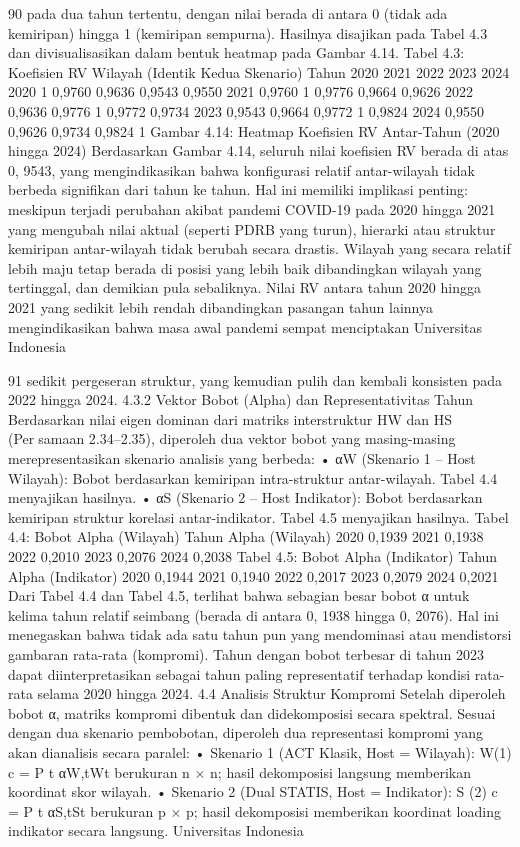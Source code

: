 90
pada dua tahun tertentu, dengan nilai berada di antara 0 (tidak ada kemiripan) hingga
1 (kemiripan sempurna). Hasilnya disajikan pada Tabel 4.3 dan divisualisasikan dalam
bentuk heatmap pada Gambar 4.14.
Tabel 4.3: Koefisien RV Wilayah (Identik Kedua Skenario)
Tahun 2020 2021 2022 2023 2024
2020 1 0,9760 0,9636 0,9543 0,9550
2021 0,9760 1 0,9776 0,9664 0,9626
2022 0,9636 0,9776 1 0,9772 0,9734
2023 0,9543 0,9664 0,9772 1 0,9824
2024 0,9550 0,9626 0,9734 0,9824 1
Gambar 4.14: Heatmap Koefisien RV Antar-Tahun (2020 hingga 2024)
Berdasarkan Gambar 4.14, seluruh nilai koefisien RV berada di atas 0, 9543, yang
mengindikasikan bahwa konfigurasi relatif antar-wilayah tidak berbeda signifikan dari
tahun ke tahun. Hal ini memiliki implikasi penting: meskipun terjadi perubahan akibat
pandemi COVID-19 pada 2020 hingga 2021 yang mengubah nilai aktual (seperti PDRB
yang turun), hierarki atau struktur kemiripan antar-wilayah tidak berubah secara drastis.
Wilayah yang secara relatif lebih maju tetap berada di posisi yang lebih baik dibandingkan
wilayah yang tertinggal, dan demikian pula sebaliknya.
Nilai RV antara tahun 2020 hingga 2021 yang sedikit lebih rendah dibandingkan
pasangan tahun lainnya mengindikasikan bahwa masa awal pandemi sempat menciptakan
Universitas Indonesia

91
sedikit pergeseran struktur, yang kemudian pulih dan kembali konsisten pada 2022 hingga
2024.
4.3.2 Vektor Bobot (Alpha) dan Representativitas Tahun
Berdasarkan nilai eigen dominan dari matriks interstruktur HW dan HS (Persamaan 2.34–2.35), diperoleh dua vektor bobot yang masing-masing merepresentasikan
skenario analisis yang berbeda:
• αW (Skenario 1 – Host Wilayah): Bobot berdasarkan kemiripan intra-struktur
antar-wilayah. Tabel 4.4 menyajikan hasilnya.
• αS (Skenario 2 – Host Indikator): Bobot berdasarkan kemiripan struktur korelasi
antar-indikator. Tabel 4.5 menyajikan hasilnya.
Tabel 4.4: Bobot Alpha (Wilayah)
Tahun Alpha (Wilayah)
2020 0,1939
2021 0,1938
2022 0,2010
2023 0,2076
2024 0,2038
Tabel 4.5: Bobot Alpha (Indikator)
Tahun Alpha (Indikator)
2020 0,1944
2021 0,1940
2022 0,2017
2023 0,2079
2024 0,2021
Dari Tabel 4.4 dan Tabel 4.5, terlihat bahwa sebagian besar bobot α untuk kelima
tahun relatif seimbang (berada di antara 0, 1938 hingga 0, 2076). Hal ini menegaskan
bahwa tidak ada satu tahun pun yang mendominasi atau mendistorsi gambaran rata-rata
(kompromi). Tahun dengan bobot terbesar di tahun 2023 dapat diinterpretasikan sebagai
tahun paling representatif terhadap kondisi rata-rata selama 2020 hingga 2024.
4.4 Analisis Struktur Kompromi
Setelah diperoleh bobot α, matriks kompromi dibentuk dan didekomposisi secara
spektral. Sesuai dengan dua skenario pembobotan, diperoleh dua representasi kompromi
yang akan dianalisis secara paralel:
• Skenario 1 (ACT Klasik, Host = Wilayah): W(1)
c =
P
t αW,tWt berukuran n × n;
hasil dekomposisi langsung memberikan koordinat skor wilayah.
• Skenario 2 (Dual STATIS, Host = Indikator): S
(2)
c =
P
t αS,tSt berukuran p × p;
hasil dekomposisi memberikan koordinat loading indikator secara langsung.
Universitas Indonesia

